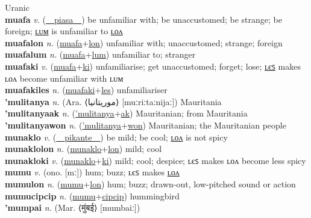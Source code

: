 Uranic \label{mippumak} \\
\textbf{muafa} \textit{v.} (\hyperref[piasa]{~~piasa~~})
be unfamiliar with; be unaccustomed; be strange; be foreign; \hyperref[muafalum]{ʟᴜᴍ} is unfamiliar to \hyperref[muafalon]{ʟᴏᴧ} \label{muafa} \\
\textbf{muafalon} \textit{n.} (\hyperref[muafa]{muafa}+\hyperref[lon]{lon})
unfamiliar with; unaccustomed; strange; foreign \label{muafalon} \\
\textbf{muafalum} \textit{n.} (\hyperref[muafa]{muafa}+\hyperref[lum]{lum})
unfamiliar to; stranger \label{muafalum} \\
\textbf{muafaki} \textit{v.} (\hyperref[muafa]{muafa}+\hyperref[ki]{ki})
unfamiliarise; get unaccustomed; forget; lose; \hyperref[muafakiles]{ʟєꜱ} makes ʟᴏᴧ become unfamiliar with ʟᴜᴍ \label{muafaki} \\
\textbf{muafakiles} \textit{n.} (\hyperref[muafaki]{muafaki}+\hyperref[les]{les})
unfamiliariser \label{muafakiles} \\
\textbf{'mulitanya} \textit{n.} (Ara. ⟨موريتانيا‎⟩ [muːriːtaːnijaː])
Mauritania \label{'mulitanya} \\
\textbf{'mulitanyaak} \textit{n.} (\hyperref['mulitanya]{'mulitanya}+\hyperref[ak]{ak})
Mauritanian; from Mauritania \label{'mulitanyaak} \\
\textbf{'mulitanyawon} \textit{n.} (\hyperref['mulitanya]{'mulitanya}+\hyperref[won]{won})
Mauritanian; the Mauritanian people \label{'mulitanyawon} \\
\textbf{munaklo} \textit{v.} (\hyperref[pikante]{~~pikante~~})
be mild; be cool; \hyperref[munaklolon]{ʟᴏᴧ} is not spicy \label{munaklo} \\
\textbf{munaklolon} \textit{n.} (\hyperref[munaklo]{munaklo}+\hyperref[lon]{lon})
mild; cool \label{munaklolon} \\
\textbf{munakloki} \textit{v.} (\hyperref[munaklo]{munaklo}+\hyperref[ki]{ki})
mild; cool; despice; ʟєꜱ makes ʟᴏᴧ become less spicy \label{munakloki} \\
\textbf{mumu} \textit{v.} (ono. [mː])
hum; buzz; ʟєꜱ makes \hyperref[mumulon]{ʟᴏᴧ} \label{mumu} \\
\textbf{mumulon} \textit{n.} (\hyperref[mumu]{mumu}+\hyperref[lon]{lon})
hum; buzz; drawn-out, low-pitched sound or action \label{mumulon} \\
\textbf{mumucipcip} \textit{n.} (\hyperref[mumu]{mumu}+\hyperref[cipcip]{cipcip})
hummingbird \label{mumucipcip} \\
\textbf{'mumpai} \textit{n.} (Mar. ⟨मुंबई⟩ [mumbaiː])
